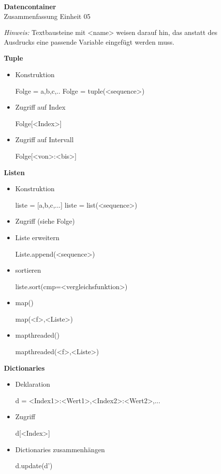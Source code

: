 \documentclass[a4paper,9pt,DIV15,twocolumn]{scrartcl}
\begin{document}
\begin{center}
    \textbf{\LARGE Datencontainer}\\
    {\large Zusammenfassung Einheit 05}
\end{center}
\textsl{Hinweis:} Textbausteine mit <name> weisen darauf hin, das anstatt des Ausdrucks eine passende Variable eingefügt werden muss.

\medskip
\textbf{Tuple}
\begin{itemize}
 \item Konstruktion
\begin{sagein}
 Folge = a,b,c,..
 Folge = tuple(<sequence>)
\end{sagein}
 \item Zugriff auf Index
\begin{sagein}
 Folge[<Index>]
\end{sagein}
 \item Zugriff auf Intervall
\begin{sagein}
 Folge[<von>:<bis>]
\end{sagein}
\end{itemize}


\textbf{Listen}
\begin{itemize}
 \item Konstruktion
\begin{sagein}
liste = [a,b,c,...] 
liste = list(<sequence>)
\end{sagein}
\item Zugriff (siehe Folge)
\item Liste erweitern
\begin{sagein}
Liste.append(<sequence>)
\end{sagein}
\item sortieren
\begin{sagein}
 liste.sort(cmp=<vergleichsfunktion>)
\end{sagein}
\item map()
\begin{sagein}
 map(<f>,<Liste>)
\end{sagein}
\item mapthreaded()
\begin{sagein}
 mapthreaded(<f>,<Liste>)
\end{sagein}
\end{itemize}

\textbf{Dictionaries}
\begin{itemize}
 \item Deklaration
\begin{sagein}
d = {<Index1>:<Wert1>,<Index2>:<Wert2>,...}
\end{sagein}
 \item Zugriff
\begin{sagein}
 d[<Index>]
\end{sagein}
\item Dictionaries zusammenhängen
\begin{sagein}
 d.update(d')
\end{sagein}
\end{itemize}
\end{document}
